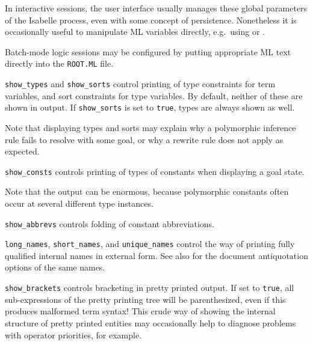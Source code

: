 \begin{isabellebody}
\begin{isamarkuptext}
  In interactive sessions, the user interface usually manages these
  global parameters of the Isabelle process, even with some concept of
  persistence.  Nonetheless it is occasionally useful to manipulate ML
  variables directly, e.g.\ using \hyperlink{command.ML-val}{\mbox{}} or \hyperlink{command.ML-command}{\mbox{}}.

  Batch-mode logic sessions may be configured by putting appropriate
  ML text directly into the \verb|ROOT.ML| file.

  \begin{description}

  \item \verb|show_types| and \verb|show_sorts| control printing of type
  constraints for term variables, and sort constraints for type
  variables.  By default, neither of these are shown in output.  If
  \verb|show_sorts| is set to \verb|true|, types are always shown as
  well.

  Note that displaying types and sorts may explain why a polymorphic
  inference rule fails to resolve with some goal, or why a rewrite
  rule does not apply as expected.

  \item \verb|show_consts| controls printing of types of constants when
  displaying a goal state.

  Note that the output can be enormous, because polymorphic constants
  often occur at several different type instances.

  \item \verb|show_abbrevs| controls folding of constant abbreviations.

  \item \verb|long_names|, \verb|short_names|, and \verb|unique_names|
  control the way of printing fully qualified internal names in
  external form.  See also  for the document
  antiquotation options of the same names.

  \item \verb|show_brackets| controls bracketing in pretty printed
  output.  If set to \verb|true|, all sub-expressions of the pretty
  printing tree will be parenthesized, even if this produces malformed
  term syntax!  This crude way of showing the internal structure of
  pretty printed entities may occasionally help to diagnose problems
  with operator priorities, for example.


\end{description}
\end{isamarkuptext}
\end{isabellebody}
